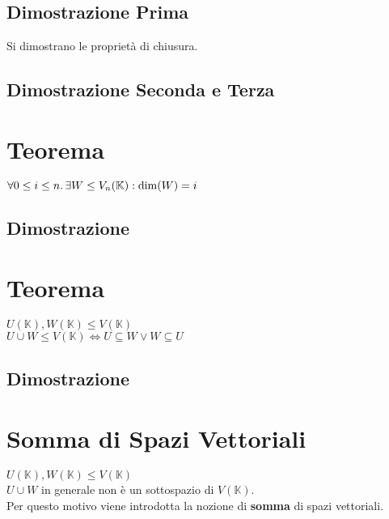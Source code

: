 \documentclass[a4paper, twoside, italian, 11pt]{book}
\newcommand{\K}{\mathbb K}
\begin{document}
\subsection{Dimostrazione Prima}


Si dimostrano le proprietà di chiusura.


\subsection{Dimostrazione Seconda e Terza}




\section{Teorema}

$\forall 0 \leq i \leq n \ldotp \exists W \leq V_n(\K) : \dim(W) = i$


\subsection {Dimostrazione}




\section{Teorema}

$U(\K), W(\K) \leq V(\K)$ \\

\noindent
$U \cup W  \leq V(\K) \iff U \subseteq W \lor W \subseteq U$


\subsection{Dimostrazione}




\section{Somma di Spazi Vettoriali}

$U(\K), W(\K) \leq V(\K)$ \\

\noindent
$U \cup W$ in generale non è un sottospazio di $V(\K)$. \\
Per questo motivo viene introdotta la nozione di \textbf{somma} di spazi vettoriali. \\
\end{document}
